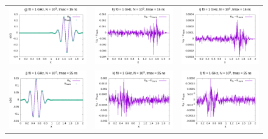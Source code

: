 \documentclass[11pt,a4paper]{report}
\begin{document}
\begin{figure}
\begin{tabular}{ccc}
\includegraphics[width=55mm]{plots/1/mc1_3_15} &   \includegraphics[width=55mm]{plots/1/mc1_3_15_dif} &   \includegraphics[width=55mm]{plots/1/mc1_5_15_dif} \\
\includegraphics[width=55mm]{plots/1/mc1_3_25} &   \includegraphics[width=55mm]{plots/1/mc1_3_25_dif} &   \includegraphics[width=55mm]{plots/1/mc1_5_25_dif} \\

\end{tabular}
\end{figure}
\end{document}

